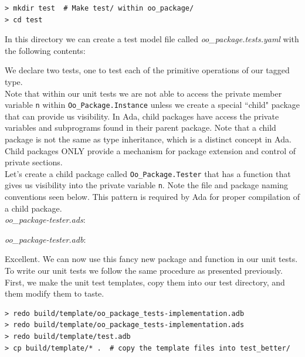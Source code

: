 \vspace{5mm} %
\begin{verbatim}
> mkdir test  # Make test/ within oo_package/
> cd test 
\end{verbatim}
\vspace{5mm} %

In this directory we can create a test model file called \textit{oo\_package.tests.yaml} with the following contents:


We declare two tests, one to test each of the primitive operations of our tagged type. \\

Note that within our unit tests we are not able to access the private member variable \texttt{n} within \texttt{Oo\_Package.Instance} unless we create a special ``child" package that can provide us visibility. In Ada, child packages have access the private variables and subprograms found in their parent package. Note that a child package is not the same as type inheritance, which is a distinct concept in Ada. Child packages ONLY provide a mechanism for package extension and control of private sections. \\

Let's create a child package called \texttt{Oo\_Package.Tester} that has a function that gives us visibility into the private variable \texttt{n}. Note the file and package naming conventions seen below. This pattern is required by Ada for proper compilation of a child package. \\

\textit{oo\_package-tester.ads}:


\textit{oo\_package-tester.adb}:


Excellent. We can now use this fancy new package and function in our unit tests. To write our unit tests we follow the same procedure as presented previously. First, we make the unit test templates, copy them into our test directory, and them modify them to taste. 

\vspace{5mm} %
\begin{verbatim}
> redo build/template/oo_package_tests-implementation.adb
> redo build/template/oo_package_tests-implementation.ads
> redo build/template/test.adb
> cp build/template/* .  # copy the template files into test_better/
\end{verbatim}
\vspace{5mm} %

